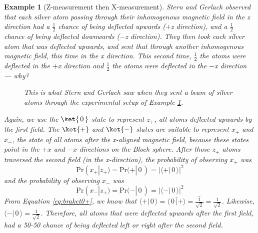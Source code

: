 \documentclass{article}
\newtheorem{example}{Example}
\theoremstyle{definition}
\newcommand*\conj[1]{\bar{#1}}
\newcommand{\abs}[1]{{\big\vert} #1 {\big\vert}}
\newcommand{\kz}[1]{\ket{\,#1\,}}
\newcommand{\kx}[1]{\ket{#1}}
\begin{document}
\begin{example}[Z-measurement then X-measurement] \label{example:sterngerlachzx}
	Stern and Gerlach observed that each silver atom passing through their inhomogenous magnetic field in the z direction had a $\frac{1}{2}$ chance of being deflected upwards ($+$z direction), and a $\frac{1}{2}$ chance of being deflected downwards ($-$z direction).  They then took each silver atom that was deflected upwards, and sent that through another inhomogenous magnetic field, this time in the x direction.  This second time, $\frac{1}{2}$ the atoms were deflected in the $+$x direction and $\frac{1}{2}$ the atoms were deflected in the $-$x direction --- why?
	
	\begin{figure}[H]
		\caption{This is what Stern and Gerlach saw when they sent a beam of silver atoms through the experimental setup of Example \ref{example:sterngerlachzx}.}
	\end{figure}

	\textnormal{Again, we use the $\kz0$ state to represent $z_+$, all atoms deflected upwards by the first field.  The $\kx+$ and $\kx-$ states are suitable to represent $x_+$ and $x_-$, the state of all atoms after the x-aligned magnetic field, because these states point in the $+x$ and $-x$ directions on the Bloch sphere.	After those $z_+$ atoms traversed the second field (in the x-direction), the probability of observing $x_+$ was
	\begin{equation}
		\text{Pr}(x_+|z_+) = \text{Pr}(+|\,0\,) = \abs{\langle+|\,0\,\rangle}^2
	\end{equation}
	and the probability of observing $x_-$ was
	\begin{equation}
		\text{Pr}(x_-|z_+) = \text{Pr}(-|\,0\,) = \abs{\langle-|\,0\,\rangle}^2
	\end{equation}
	From Equation \ref{eq:braket0+}, we know that $\langle+|\,0\,\rangle = \conj{\langle\,0\,|+\rangle} = \conj{\frac{1}{\sqrt{2}}} = \frac{1}{\sqrt{2}}$.  Likewise, $\langle-|\,0\,\rangle = \frac{1}{\sqrt{2}}$.  Therefore, all atoms that were deflected upwards after the first field, had a 50-50 chance of being deflected left or right after the second field.}
\end{example}
\end{document}
